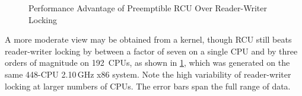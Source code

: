 \begin{figure}
\centering
{}
\caption{Performance Advantage of Preemptible RCU Over Reader-Writer Locking}
\label{fig:defer:Performance Advantage of Preemptible RCU Over Reader-Writer Locking}
\end{figure}

A more moderate view may be obtained from a  kernel,
though RCU still beats reader-writer locking by between a factor of seven
on a single CPU and by three orders of magnitude on 192~CPUs, as shown in
\cref{fig:defer:Performance Advantage of Preemptible RCU Over Reader-Writer Locking},
which was generated on the same 448-CPU 2.10\,GHz x86 system.
Note the high variability of reader-writer locking at larger numbers of CPUs.
The error bars span the full range of data.

\QuickQuizEnd

